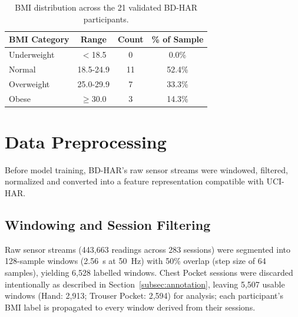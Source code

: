 \documentclass[conference]{IEEEtran}
\begin{document}
\begin{table}[!t]
\centering
\footnotesize
\caption{BMI distribution across the 21 validated BD-HAR participants.}
\label{tab:bmi_dist}
\begin{tabular}{lccc}
\hline
BMI Category & Range & Count & \% of Sample \\
\hline
Underweight & $<$18.5 & 0 & 0.0\% \\
Normal & 18.5-24.9 & 11 & 52.4\% \\
Overweight & 25.0-29.9 & 7 & 33.3\% \\
Obese & $\geq$30.0 & 3 & 14.3\% \\
\hline
\end{tabular}
\end{table}

\section{Data Preprocessing}
\label{sec:preprocessing}

Before model training, BD-HAR's raw sensor streams were windowed,
filtered, normalized and converted into a feature representation
compatible with UCI-HAR.

\subsection{Windowing and Session Filtering}
Raw sensor streams (443{,}663 readings across 283 sessions) were
segmented into 128-sample windows (2.56~s at 50~Hz) with 50\% overlap
(step size of 64 samples), yielding 6{,}528 labelled windows. Chest
Pocket sessions were discarded intentionally as described in
Section~\ref{subsec:annotation}, leaving 5{,}507 usable windows (Hand:
2{,}913; Trouser Pocket: 2{,}594) for analysis; each participant's BMI
label is propagated to every window derived from their sessions.
\end{document}

